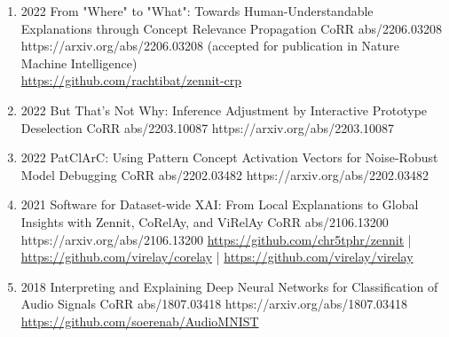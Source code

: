 {\begin{enumerate}
        \newpage %
        \item {}
                        {2022}
                        {From "Where" to "What": Towards Human-Understandable Explanations through Concept Relevance Propagation}
                        {CoRR abs/2206.03208}
                        {https://arxiv.org/abs/2206.03208}
                        {(accepted for publication in Nature Machine Intelligence)\\ \href{https://github.com/rachtibat/zennit-crp}{https://github.com/rachtibat/zennit-crp}}

        \item {}
                            {2022}
                            {But That's Not Why: Inference Adjustment by Interactive Prototype Deselection}
                            {CoRR abs/2203.10087}
                            {https://arxiv.org/abs/2203.10087}

        \item {}
                            {2022}
                            {PatClArC: Using Pattern Concept Activation Vectors for Noise-Robust Model Debugging}
                            {CoRR abs/2202.03482}
                            {https://arxiv.org/abs/2202.03482}

        \item {}
                            {2021}
                            {Software for Dataset-wide XAI: From Local Explanations to Global Insights with Zennit, CoRelAy, and ViRelAy}
                            {CoRR abs/2106.13200}
                            {https://arxiv.org/abs/2106.13200}
                            {   \href{https://github.com/chr5tphr/zennit}{https://github.com/chr5tphr/zennit} | \\
                                \href{https://github.com/virelay/corelay}{https://github.com/virelay/corelay} |
                                \href{https://github.com/virelay/virelay}{https://github.com/virelay/virelay}
                            }

        \item {}
                            {2018}
                            {Interpreting and Explaining Deep Neural Networks for Classification of Audio Signals}
                            {CoRR abs/1807.03418}
                            {https://arxiv.org/abs/1807.03418}
                            {\href{https://github.com/soerenab/AudioMNIST}{https://github.com/soerenab/AudioMNIST}}


\end{enumerate}}
